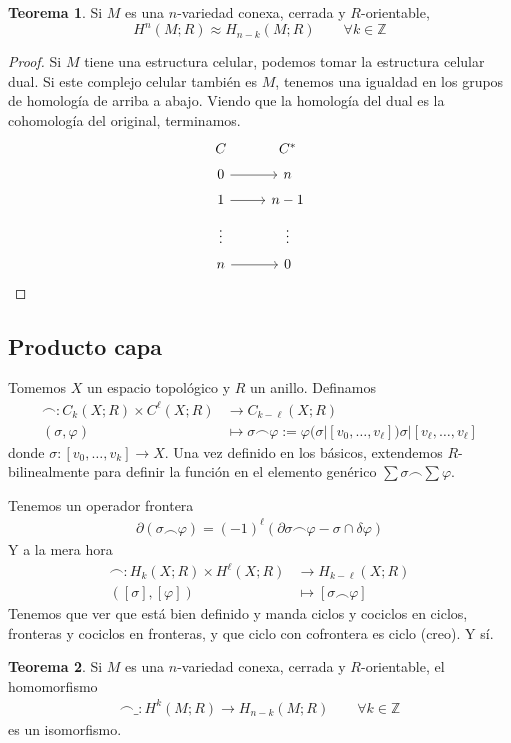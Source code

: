 \documentclass[spanish]{book}
\theoremstyle{definition}
\newtheorem*{teo}{Teorema}
\newcommand{\Z}{\mathbb{Z}}
\begin{document}
\begin{teo}
	Si $M$ es una $n$-variedad conexa, cerrada y $R$-orientable,
	\[H^n(M;R)\approx H_{n-k}(M;R)\qquad\forall k\in\Z\]
\end{teo}
\begin{proof}
	Si $M$ tiene una estructura celular, podemos tomar la estructura celular dual. Si este complejo celular también es $M$, tenemos una igualdad en los grupos de homología de arriba a abajo. Viendo que la homología del dual es la cohomología del original, terminamos.
	\[\begin{tikzcd}[row sep=tiny]
		C&C^*\\
		0\arrow[r]&n\\
		1\arrow[r]&n-1\\
		\vdots&\vdots\\
		n\arrow[r]&0
	\end{tikzcd}\]
\end{proof}

\subsection{Producto capa}
Tomemos $X$ un espacio topológico y $R$ un anillo. Definamos
\begin{align*}
	\frown :C_k(X;R)\times C^\ell(X;R)&\to C_{k-\ell}(X;R)\\
	(\sigma,\varphi)&\mapsto\sigma\frown\varphi:=\varphi(\sigma|[v_0,\ldots,v_\ell])\sigma|[v_\ell,\ldots,v_\ell]
\end{align*}
donde $\sigma:[v_0,\ldots,v_k]\to X$. Una vez definido en los básicos, extendemos $R$-bilinealmente para definir la función en el elemento genérico $\sum\sigma\frown\sum\varphi$.

Tenemos un operador frontera
\begin{align*}
	\partial(\sigma\frown\varphi)=(-1)^\ell(\partial\sigma\frown\varphi-\sigma\cap\delta\varphi)
\end{align*}
Y a la mera hora
\begin{align*}
	\frown:H_k(X;R)\times H^\ell(X;R)&\to H_{k-\ell}(X;R)\\
	([\sigma],[\varphi])&\mapsto[\sigma\frown\varphi]
\end{align*}
Tenemos que ver que está bien definido y manda ciclos y cociclos en ciclos, fronteras y cociclos en fronteras, y que ciclo con cofrontera es ciclo (creo). Y sí.

\begin{teo}
	Si $M$ es una $n$-variedad conexa, cerrada y $R$-orientable, el homomorfismo
	\begin{align*}
		[M]\frown\_:H^k(M;R)\to H_{n-k}(M;R)\qquad\forall k\in\Z
	\end{align*}
	es un isomorfismo.
\end{teo}
\end{document}
